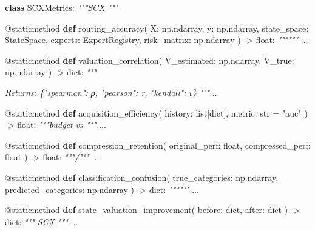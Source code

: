 \documentclass[
  12pt,
]{article}
\newenvironment{Shaded}{}{}
\newcommand{\AttributeTok}[1]{\textcolor[rgb]{0.49,0.56,0.16}{#1}}
\newcommand{\BuiltInTok}[1]{\textcolor[rgb]{0.00,0.50,0.00}{#1}}
\newcommand{\CommentTok}[1]{\textcolor[rgb]{0.38,0.63,0.69}{\textit{#1}}}
\newcommand{\KeywordTok}[1]{\textcolor[rgb]{0.00,0.44,0.13}{\textbf{#1}}}
\newcommand{\NormalTok}[1]{#1}
\newcommand{\OperatorTok}[1]{\textcolor[rgb]{0.40,0.40,0.40}{#1}}
\newcommand{\StringTok}[1]{\textcolor[rgb]{0.25,0.44,0.63}{#1}}
\begin{document}
\begin{Shaded}
\begin{Highlighting}[]
\KeywordTok{class}\NormalTok{ SCXMetrics:}
    \CommentTok{"""SCX """}

    \AttributeTok{@staticmethod}
    \KeywordTok{def}\NormalTok{ routing\_accuracy(}
\NormalTok{        X: np.ndarray, y: np.ndarray,}
\NormalTok{        state\_space: StateSpace,}
\NormalTok{        experts: ExpertRegistry,}
\NormalTok{        risk\_matrix: np.ndarray}
\NormalTok{    ) }\OperatorTok{{-}\textgreater{}} \BuiltInTok{float}\NormalTok{:}
        \CommentTok{""""""}
\NormalTok{        ...}

    \AttributeTok{@staticmethod}
    \KeywordTok{def}\NormalTok{ valuation\_correlation(}
\NormalTok{        V\_estimated: np.ndarray,}
\NormalTok{        V\_true: np.ndarray}
\NormalTok{    ) }\OperatorTok{{-}\textgreater{}} \BuiltInTok{dict}\NormalTok{:}
        \CommentTok{"""}

\CommentTok{        Returns: \{"spearman": ρ, "pearson": r, "kendall": τ\}}
\CommentTok{        """}
\NormalTok{        ...}

    \AttributeTok{@staticmethod}
    \KeywordTok{def}\NormalTok{ acquisition\_efficiency(}
\NormalTok{        history: }\BuiltInTok{list}\NormalTok{[}\BuiltInTok{dict}\NormalTok{],}
\NormalTok{        metric: }\BuiltInTok{str} \OperatorTok{=} \StringTok{"auc"}
\NormalTok{    ) }\OperatorTok{{-}\textgreater{}} \BuiltInTok{float}\NormalTok{:}
        \CommentTok{"""budget vs """}
\NormalTok{        ...}

    \AttributeTok{@staticmethod}
    \KeywordTok{def}\NormalTok{ compression\_retention(}
\NormalTok{        original\_perf: }\BuiltInTok{float}\NormalTok{,}
\NormalTok{        compressed\_perf: }\BuiltInTok{float}
\NormalTok{    ) }\OperatorTok{{-}\textgreater{}} \BuiltInTok{float}\NormalTok{:}
        \CommentTok{"""/"""}
\NormalTok{        ...}

    \AttributeTok{@staticmethod}
    \KeywordTok{def}\NormalTok{ classification\_confusion(}
\NormalTok{        true\_categories: np.ndarray,}
\NormalTok{        predicted\_categories: np.ndarray}
\NormalTok{    ) }\OperatorTok{{-}\textgreater{}} \BuiltInTok{dict}\NormalTok{:}
        \CommentTok{""""""}
\NormalTok{        ...}

    \AttributeTok{@staticmethod}
    \KeywordTok{def}\NormalTok{ state\_valuation\_improvement(}
\NormalTok{        before: }\BuiltInTok{dict}\NormalTok{, after: }\BuiltInTok{dict}
\NormalTok{    ) }\OperatorTok{{-}\textgreater{}} \BuiltInTok{dict}\NormalTok{:}
        \CommentTok{""" SCX """}
\NormalTok{        ...}
\end{Highlighting}
\end{Shaded}
\end{document}
